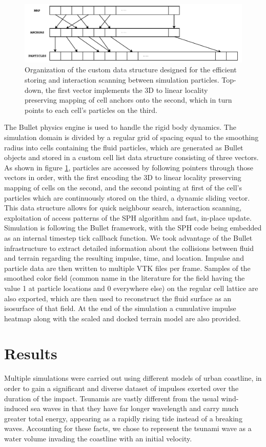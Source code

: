 \documentclass{llncs}
\begin{document}
\begin{figure}
  \includegraphics[width=\textwidth]{../report/figures/lp-grid.pdf}
  \caption{Organization of the custom data structure designed for the efficient storing
    and interaction scanning between simulation particles. Top-down, the first vector
    implements the 3D to linear locality preserving mapping of cell anchors onto the
    second, which in turn points to each cell's particles on the third.}
  \label{fig:lp-grid}
\end{figure}

The Bullet physics engine is used to handle the rigid body dynamics. The simulation domain
is divided by a regular grid of spacing equal to the smoothing radius into cells
containing the fluid particles, which are generated as Bullet objects and stored in a
custom cell list data structure consisting of three vectors. As shown in figure
\ref{fig:lp-grid}, particles are accessed by following pointers through those vectors in
order, with the first encoding the 3D to linear locality preserving mapping of cells on
the second, and the second pointing at first of the cell's particles which are
continuously stored on the third, a dynamic sliding vector. This data structure allows for
quick neighbour search, interaction scanning, exploitation of access patterns of the SPH
algorithm and fast, in-place update. Simulation is following the Bullet framework, with
the SPH code being embedded as an internal timestep tick callback function. We took
advantage of the Bullet infrastructure to extract detailed information about the
collisions between fluid and terrain regarding the resulting impulse, time, and
location. Impulse and particle data are then written to multiple VTK files per
frame. Samples of the smoothed color field (common name in the literature for the field
having the value 1 at particle locations and 0 everywhere else) on the regular cell
lattice are also exported, which are then used to reconstruct the fluid surface as an
isosurface of that field. At the end of the simulation a cumulative impulse heatmap along
with the scaled and docked terrain model are also provided.

\section{Results}
Multiple simulations were carried out using different models of urban coastline, in order
to gain a significant and diverse dataset of impulses exerted over the duration of the
impact. Tsunamis are vastly different from the usual wind-induced sea waves in that they
have far longer wavelength and carry much greater total energy, appearing as a rapidly
rising tide instead of a breaking waves. Accounting for these facts, we chose to represent
the tsunami wave as a water volume invading the coastline with an initial velocity.
\end{document}
